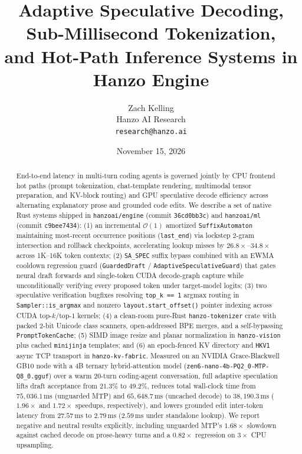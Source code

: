 \documentclass[11pt,a4paper]{article}
\title{\textbf{Adaptive Speculative Decoding, Sub-Millisecond Tokenization,\\and Hot-Path Inference Systems in Hanzo Engine}}
\author{
  Zach Kelling \\
  Hanzo AI Research \\
  \texttt{research@hanzo.ai}
}
\date{November 15, 2026}
\begin{document}
\maketitle

\begin{abstract}
End-to-end latency in multi-turn coding agents is governed jointly by CPU frontend hot paths (prompt tokenization, chat-template rendering, multimodal tensor preparation, and KV-block routing) and GPU speculative decode efficiency across alternating explanatory prose and grounded code edits. We describe a set of native Rust systems shipped in \texttt{hanzoai/engine} (commit \texttt{36cd0bb3c}) and \texttt{hanzoai/ml} (commit \texttt{c9bee7434}): (1) an incremental $\mathcal{O}(1)$ amortized \texttt{SuffixAutomaton} maintaining most-recent occurrence positions (\texttt{last\_end}) via lockstep 2-gram intersection and rollback checkpoints, accelerating lookup misses by $26.8\times$--$34.8\times$ across 1K--16K token contexts; (2) \texttt{SA\_SPEC} suffix bypass combined with an EWMA cooldown regression guard (\texttt{GuardedDraft} / \texttt{AdaptiveSpeculativeGuard}) that gates neural draft forwards and single-token CUDA decode-graph capture while unconditionally verifying every proposed token under target-model logits; (3) two speculative verification bugfixes resolving \texttt{top\_k == 1} argmax routing in \texttt{Sampler::is\_argmax} and nonzero \texttt{layout.start\_offset()} pointer indexing across CUDA top-$k$/top-$1$ kernels; (4) a clean-room pure-Rust \texttt{hanzo-tokenizer} crate with packed 2-bit Unicode class scanners, open-addressed BPE merges, and a self-bypassing \texttt{PromptTokenCache}; (5) SIMD image resize and planar normalization in \texttt{hanzo-vision} plus cached \texttt{minijinja} templates; and (6) an epoch-fenced KV directory and \texttt{HKV1} async TCP transport in \texttt{hanzo-kv-fabric}. Measured on an NVIDIA Grace-Blackwell GB10 node with a 4B ternary hybrid-attention model (\texttt{zen6-nano-4b-PQ2\_0-MTP-Q8\_0.gguf}) over a warm 20-turn coding-agent conversation, full adaptive speculation lifts draft acceptance from $21.3\%$ to $49.2\%$, reduces total wall-clock time from $75{,}036.1\,\text{ms}$ (unguarded MTP) and $65{,}648.7\,\text{ms}$ (uncached decode) to $38{,}190.3\,\text{ms}$ ($1.96\times$ and $1.72\times$ speedups, respectively), and lowers grounded edit inter-token latency from $27.57\,\text{ms}$ to $2.79\,\text{ms}$ ($2.59\,\text{ms}$ under standalone lookup). We report negative and neutral results explicitly, including unguarded MTP's $1.68\times$ slowdown against cached decode on prose-heavy turns and a $0.82\times$ regression on $3\times$ CPU upsampling.
\end{abstract}
\end{document}
